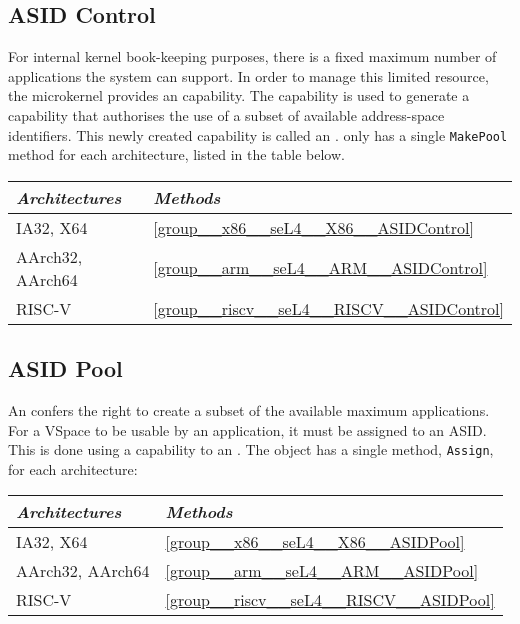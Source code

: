 \subsection{ASID Control}

For internal kernel book-keeping purposes, there is a fixed maximum
number of applications the system can support.  In order to manage
this limited resource, the microkernel provides an 
capability. The  capability is used to generate a
capability that authorises the use of a subset of available address-space identifiers.
This newly created capability is called an
.  only has a single \texttt{MakePool} method for each
architecture, listed in the table below.

\begin{tabularx}{\textwidth}{Xl} \toprule
\emph{Architectures} & \emph{Methods} \\ \midrule
IA32, X64            & \autoref{group__x86__seL4__X86__ASIDControl} \\
AArch32, AArch64     & \autoref{group__arm__seL4__ARM__ASIDControl} \\
RISC-V               & \autoref{group__riscv__seL4__RISCV__ASIDControl} \\
\bottomrule
\end{tabularx}

\subsection{ASID Pool}

An  confers the right to create a subset of the available
maximum applications. For a VSpace to be usable by an application, it
must be assigned to an ASID. This is done using a capability to an
. The  object has a single method, \texttt{Assign}, for each
architecture:

\begin{tabularx}{\textwidth}{Xl} \toprule
\emph{Architectures} & \emph{Methods} \\ \midrule
IA32, X64            & \autoref{group__x86__seL4__X86__ASIDPool} \\
AArch32, AArch64     & \autoref{group__arm__seL4__ARM__ASIDPool} \\
RISC-V               & \autoref{group__riscv__seL4__RISCV__ASIDPool} \\
\bottomrule
\end{tabularx}

